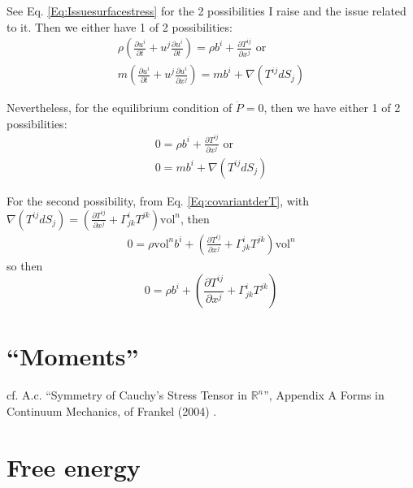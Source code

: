\documentclass[twoside,landscape,10pt]{amsart}
\theoremstyle{plain}
\theoremstyle{definition}
\theoremstyle{remark}
\begin{document}
\begin{multicols*}{2}
See Eq. \ref{Eq:Issuesurfacestress} for the 2 possibilities I raise and the issue related to it.  Then we either have 1 of 2 possibilities:
\begin{equation}
  \begin{gathered}
    \rho \left( \frac{ \partial u^i}{ \partial t} + u^j \frac{ \partial u^i}{ \partial t} \right) = \rho b^i + \frac{ \partial T^{ij}}{ \partial x^j}  \text{ or } \\ 
    m \left( \frac{ \partial u^i}{ \partial t} + u^j \frac{ \partial u^i}{ \partial x^j} \right) = mb^i + \nabla (T^{ij}dS_j)
\end{gathered}
\end{equation}

Nevertheless, for the equilibrium condition of $\dot{P}=0$, then we have either 1 of 2 possibilities:
\begin{equation}\label{Eq:equilibrium2possibilities}
  \begin{gathered}
0 = \rho b^i + \frac{ \partial T^{ij}}{ \partial x^j}  \text{ or } \\ 
0 =  mb^i + \nabla (T^{ij}dS_j)
\end{gathered}
\end{equation}

For the second possibility, from Eq. \ref{Eq:covariantderT}, with $\nabla (T^{ij}dS_j) = \left( \frac{ \partial T^{ij}}{ \partial x^j} + \Gamma^i_{jk} T^{jk} \right)\text{vol}^n$, then 
\[
\begin{gathered}
  0 = \rho \text{vol}^n b^i + \left( \frac{ \partial T^{ij}}{ \partial x^j} + \Gamma^i_{jk} T^{jk} \right)\text{vol}^n 
\end{gathered}
\]
so then 
\begin{equation}
 0 = \rho b^i + \left( \frac{ \partial T^{ij}}{ \partial x^j} + \Gamma^i_{jk} T^{jk} \right) 
\end{equation}


\section{``Moments''}

cf. A.c. ``Symmetry of Cauchy's Stress Tensor in $\mathbb{R}^n$'', Appendix A Forms in Continuum Mechanics, of Frankel (2004) \cite{TFrankel2004}.  



\section{Free energy}


\end{multicols*}
\end{document}
